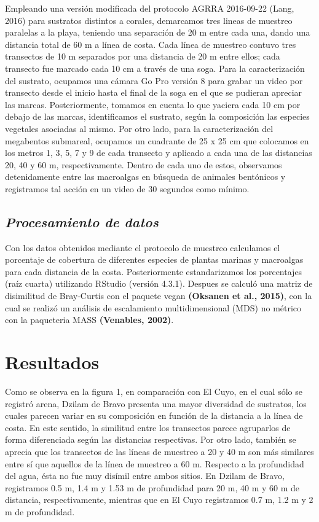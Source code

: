 \documentclass[
  authoryear,
  preprint,
  3p,
  twocolumn]{elsarticle}
\begin{document}
Empleando una versión modificada del protocolo AGRRA 2016-09-22 (Lang,
2016) para sustratos distintos a corales, demarcamos tres lineas de
muestreo paralelas a la playa, teniendo una separación de 20 m entre
cada una, dando una distancia total de 60 m a línea de costa. Cada línea
de muestreo contuvo tres transectos de 10 m separados por una distancia
de 20 m entre ellos; cada transecto fue marcado cada 10 cm a través de
una soga. Para la caracterización del sustrato, ocupamos una cámara Go
Pro versión 8 para grabar un video por transecto desde el inicio hasta
el final de la soga en el que se pudieran apreciar las marcas.
Posteriormente, tomamos en cuenta lo que yaciera cada 10 cm por debajo
de las marcas, identificamos el sustrato, según la composición las
especies vegetales asociadas al mismo. Por otro lado, para la
caracterización del megabentos submareal, ocupamos un cuadrante de 25 x
25 cm que colocamos en los metros 1, 3, 5, 7 y 9 de cada transecto y
aplicado a cada una de las distancias 20, 40 y 60 m, respectivamente.
Dentro de cada uno de estos, observamos detenidamente entre las
macroalgas en búsqueda de animales bentónicos y registramos tal acción
en un video de 30 segundos como mínimo.

\hypertarget{procesamiento-de-datos}{%
\subsection{\texorpdfstring{\emph{Procesamiento de
datos}}{Procesamiento de datos}}\label{procesamiento-de-datos}}

Con los datos obtenidos mediante el protocolo de muestreo calculamos el
porcentaje de cobertura de diferentes especies de plantas marinas y
macroalgas para cada distancia de la costa. Posteriormente
estandarizamos los porcentajes (raíz cuarta) utilizando RStudio (versión
4.3.1). Despues se calculó una matriz de disimilitud de Bray-Curtis con
el paquete vegan \textbf{(Oksanen et al., 2015)}, con la cual se realizó
un análisis de escalamiento multidimensional (MDS) no métrico con la
paqueteria MASS \textbf{(Venables, 2002)}.

\hypertarget{resultados}{%
\section{Resultados}\label{resultados}}

Como se observa en la figura 1, en comparación con El Cuyo, en el cual
sólo se registró arena, Dzilam de Bravo presenta una mayor diversidad de
sustratos, los cuales parecen variar en su composición en función de la
distancia a la línea de costa. En este sentido, la similitud entre los
transectos parece agruparlos de forma diferenciada según las distancias
respectivas. Por otro lado, también se aprecia que los transectos de las
líneas de muestreo a 20 y 40 m son más similares entre sí que aquellos
de la línea de muestreo a 60 m. Respecto a la profundidad del agua, ésta
no fue muy disímil entre ambos sitios. En Dzilam de Bravo, registramos
0.5 m, 1.4 m y 1.53 m de profundidad para 20 m, 40 m y 60 m de
distancia, respectivamente, mientras que en El Cuyo registramos 0.7 m,
1.2 m y 2 m de profundidad.~
\end{document}
